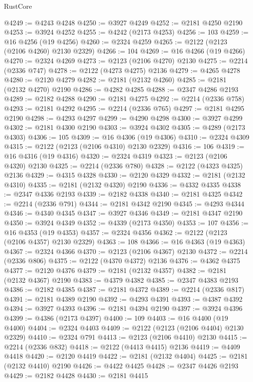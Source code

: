 \begin{lexlean}{RustCore}
\begin{coremodule}
@4249 := @4243 @4248
@4250 := @3927 @4249
@4252 := @2181 @4250 @2190
@4253 := @3924 @4252
@4255 := @4242 (@2173 @4253)
@4256 := 103
@4259 := @16 @4256 (@19 @4256)
@4260 := @2324 @4259
@4265 := @2122 (@2123 (@2106 @4260) @2130 @2329)
@4266 := 104
@4269 := @16 @4266 (@19 @4266)
@4270 := @2324 @4269
@4273 := @2123 (@2106 @4270) @2130
@4275 := @2214 (@2336 @747)
@4278 := @2122 (@4273 @4275) @2136
@4279 := @4265 @4278
@4280 := @2120 @4279
@4282 := @2181 (@2132 @4260)
@4285 := @2181 (@2132 @4270) @2190
@4286 := @4282 @4285
@4288 := @2347 @4286 @2193
@4289 := @2182 @4288
@4290 := @2181 @4275
@4292 := @2214 (@2336 @758)
@4293 := @2181 @4292
@4295 := @2214 (@2336 @765)
@4297 := @2181 @4295 @2190
@4298 := @4293 @4297
@4299 := @4290 @4298
@4300 := @3927 @4299
@4302 := @2181 @4300 @2190
@4303 := @3924 @4302
@4305 := @4289 (@2173 @4303)
@4306 := 105
@4309 := @16 @4306 (@19 @4306)
@4310 := @2324 @4309
@4315 := @2122 (@2123 (@2106 @4310) @2130 @2329)
@4316 := 106
@4319 := @16 @4316 (@19 @4316)
@4320 := @2324 @4319
@4323 := @2123 (@2106 @4320) @2130
@4325 := @2214 (@2336 @780)
@4328 := @2122 (@4323 @4325) @2136
@4329 := @4315 @4328
@4330 := @2120 @4329
@4332 := @2181 (@2132 @4310)
@4335 := @2181 (@2132 @4320) @2190
@4336 := @4332 @4335
@4338 := @2347 @4336 @2193
@4339 := @2182 @4338
@4340 := @2181 @4325
@4342 := @2214 (@2336 @791)
@4344 := @2181 @4342 @2190
@4345 := @4293 @4344
@4346 := @4340 @4345
@4347 := @3927 @4346
@4349 := @2181 @4347 @2190
@4350 := @3924 @4349
@4352 := @4339 (@2173 @4350)
@4353 := 107
@4356 := @16 @4353 (@19 @4353)
@4357 := @2324 @4356
@4362 := @2122 (@2123 (@2106 @4357) @2130 @2329)
@4363 := 108
@4366 := @16 @4363 (@19 @4363)
@4367 := @2324 @4366
@4370 := @2123 (@2106 @4367) @2130
@4372 := @2214 (@2336 @806)
@4375 := @2122 (@4370 @4372) @2136
@4376 := @4362 @4375
@4377 := @2120 @4376
@4379 := @2181 (@2132 @4357)
@4382 := @2181 (@2132 @4367) @2190
@4383 := @4379 @4382
@4385 := @2347 @4383 @2193
@4386 := @2182 @4385
@4387 := @2181 @4372
@4389 := @2214 (@2336 @817)
@4391 := @2181 @4389 @2190
@4392 := @4293 @4391
@4393 := @4387 @4392
@4394 := @3927 @4393
@4396 := @2181 @4394 @2190
@4397 := @3924 @4396
@4399 := @4386 (@2173 @4397)
@4400 := 109
@4403 := @16 @4400 (@19 @4400)
@4404 := @2324 @4403
@4409 := @2122 (@2123 (@2106 @4404) @2130 @2329)
@4410 := @2324 @791
@4413 := @2123 (@2106 @4410) @2130
@4415 := @2214 (@2336 @832)
@4418 := @2122 (@4413 @4415) @2136
@4419 := @4409 @4418
@4420 := @2120 @4419
@4422 := @2181 (@2132 @4404)
@4425 := @2181 (@2132 @4410) @2190
@4426 := @4422 @4425
@4428 := @2347 @4426 @2193
@4429 := @2182 @4428
@4430 := @2181 @4415

\end{coremodule}
\end{lexlean}
